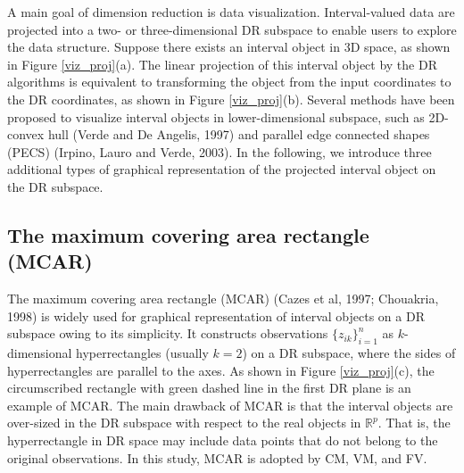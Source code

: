 \documentclass[article]{jss}
\begin{document}
A main goal of dimension reduction is data
visualization. Interval-valued data are projected into a
two- or three-dimensional DR subspace to enable users to
explore the data structure. Suppose there exists an interval
object in 3D space, as shown in Figure \ref{viz_proj}(a). The
linear projection of this interval object by the DR
algorithms is equivalent to transforming the object from the
input coordinates to the DR coordinates, as shown in Figure
\ref{viz_proj}(b). Several methods have been proposed to
visualize interval objects in lower-dimensional
subspace, such as 2D-convex hull (Verde and De Angelis,
1997) and parallel edge connected shapes (PECS)
(Irpino, Lauro and Verde, 2003). In the following, we
introduce three additional types of graphical
representation of the projected interval object on the DR
subspace.



\subsection{The maximum covering area rectangle (MCAR)}
The maximum covering area rectangle (MCAR) (Cazes et al,
1997; Chouakria, 1998) is widely used for graphical
representation of interval objects on a DR subspace owing to
its simplicity. It constructs observations
$\{z_{ik}\}_{i=1}^n$ as $k$-dimensional hyperrectangles
(usually $k=2$) on a DR subspace, where the sides of
hyperrectangles are parallel to the axes. As shown in
Figure \ref{viz_proj}(c), the circumscribed rectangle with 
green
dashed line in the first DR plane is an example of MCAR. The
main drawback of MCAR is that the interval objects are
over-sized in the DR subspace with respect to the real
objects in $\mathbb{R}^p$. That is, the hyperrectangle in
DR space may include data points that do not belong to the
original observations. In this study, MCAR is adopted by
CM, VM, and FV.



\end{document}
